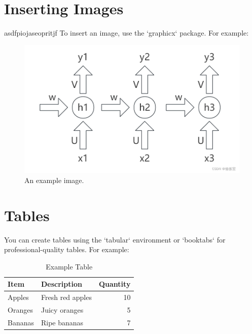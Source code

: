 \documentclass[12pt,a4paper]{article}
\begin{document}




\section{Inserting Images}
asdfpiojaseopritjf
To insert an image, use the `graphicx` package. For example:

\begin{figure}[!htb]
    \centering
    \includegraphics[width=1\textwidth]{../Pic/pic1.png} %
    \caption{An example image.}
    \label{fig:example}
\end{figure}

\section{Tables}
You can create tables using the `tabular` environment or `booktabs` for professional-quality tables. For example:

\begin{table}[h!]
\centering
\caption{Example Table}
\begin{tabular}{@{}llr@{}}
\toprule
\textbf{Item} & \textbf{Description} & \textbf{Quantity} \\ \midrule
Apples        & Fresh red apples     & 10                \\
Oranges       & Juicy oranges        & 5                 \\
Bananas       & Ripe bananas         & 7                 \\ \bottomrule
\end{tabular}
\label{tab:example}
\end{table}
\end{document}
